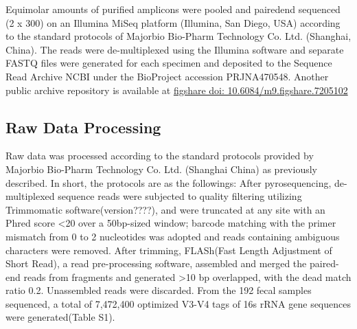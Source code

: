 \documentclass[fleqn,10pt]{wlpeerj} %
\begin{document}
  \noindent
  Equimolar amounts of purified amplicons were pooled and paired\-end sequenced (2 x 300) on an Illumina MiSeq platform (Illumina, San Diego, USA) according to the standard protocols of Majorbio Bio-Pharm Technology Co. Ltd. (Shanghai, China). The reads were de-multiplexed using the Illumina software and separate FASTQ files were generated for each specimen and deposited to the Sequence Read Archive NCBI under the BioProject accession PRJNA470548. Another public archive repository is available at \href{https://figshare.com/articles/Untitled_Item192_samples_for_publishing_Longitudinal_gut_microbiota_patterns_in_preterm_infants_with_necrotizing_enterocolitis_or_late-onset_sepsis_an_observational_prospective_study_/7205102}{figshare doi: 10.6084/m9.figshare.7205102}

  \subsection*{Raw Data Processing}
  Raw data was processed according to the standard protocols provided by Majorbio Bio-Pharm Technology Co. Ltd. (Shanghai China) as previously described\citep{liu2018splenectomy, wang2018bacterial}. In short, the protocols are as the followings:
  After pyrosequencing, de-multiplexed sequence reads were subjected to quality filtering utilizing Trimmomatic software(version????)\citep{bolger2014trimmomatic},  and were truncated at any site with an Phred score \textless 20 over a 50bp-sized window; barcode matching with the primer mismatch from 0 to 2 nucleotides was adopted and reads containing ambiguous characters were removed. After trimming, FLASh(Fast Length Adjustment of Short Read)\citep{magovc2011flash}, a read pre-processing software, assembled and merged the paired-end reads from fragments and generated \textgreater 10 bp overlapped, with the dead match ratio 0.2. Unassembled reads were discarded. From the 192 fecal samples sequenced, a total of 7,472,400 optimized V3-V4 tags of 16s rRNA gene sequences were generated(Table S1).\\
\end{document}
